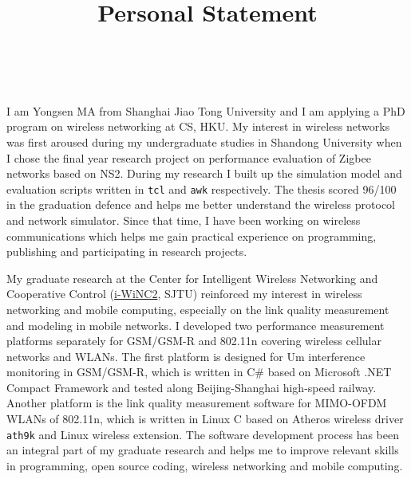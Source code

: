 \documentclass[journal,onecolumn]{IEEEtran}
\title{Personal Statement}
\author{\IEEEauthorblockN{Yongsen MA} \\
}
\begin{document}
\maketitle%

I am Yongsen MA from Shanghai Jiao Tong University and I am applying a PhD program on wireless networking at CS, HKU. My interest in wireless networks was first aroused during my undergraduate studies in Shandong University when I chose the final year research project on performance evaluation of Zigbee networks based on NS2. During my research I built up the simulation model and evaluation scripts written in \verb"tcl" and \verb"awk" respectively. The thesis scored 96/100 in the graduation defence and helps me better understand the wireless protocol and network simulator. Since that time, I have been working on wireless communications which helps me gain practical experience on programming, publishing and participating in research projects.

My graduate research at the Center for Intelligent Wireless Networking and Cooperative Control (\href{http://wicnc.sjtu.edu.cn}{i-WiNC2}, SJTU) reinforced my interest in wireless networking and mobile computing, especially on the link quality measurement and modeling in mobile networks. I developed two performance measurement platforms separately for GSM/GSM-R and 802.11n covering wireless cellular networks and WLANs. The first platform is designed for Um interference monitoring in GSM/GSM-R, which is written in C\# based on Microsoft .NET Compact Framework and tested along Beijing-Shanghai high-speed railway. Another platform is the link quality measurement software for MIMO-OFDM WLANs of 802.11n, which is written in Linux C based on Atheros wireless driver \texttt{ath9k} and Linux wireless extension. The software development process has been an integral part of my graduate research and helps me to improve relevant skills in programming, open source coding, wireless networking and mobile computing.
\end{document}
